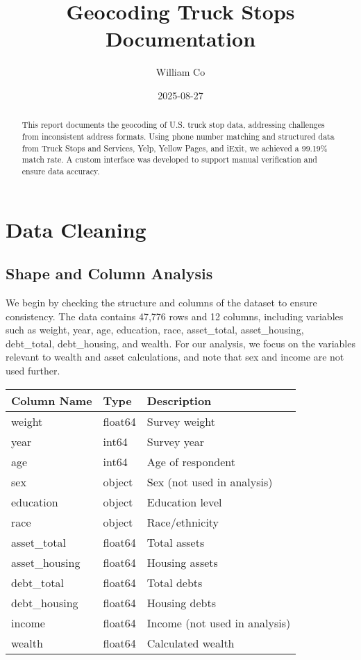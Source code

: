 \documentclass[
  letterpaper,
  DIV=11,
  numbers=noendperiod]{scrartcl}
\title{Geocoding Truck Stops Documentation}
\author{William Co}
\date{2025-08-27}
\renewcommand*\contentsname{Table of contents}
\newcommand\contentsname{Table of contents}
\begin{document}
\maketitle
\begin{abstract}
This report documents the geocoding of U.S. truck stop data, addressing
challenges from inconsistent address formats. Using phone number
matching and structured data from Truck Stops and Services, Yelp, Yellow
Pages, and iExit, we achieved a 99.19\% match rate. A custom interface
was developed to support manual verification and ensure data accuracy.
\end{abstract}

\renewcommand*\contentsname{Table of contents}
{
\hypersetup{linkcolor=}
\setcounter{tocdepth}{3}
\tableofcontents
}
\section{Data Cleaning}\label{data-cleaning}

\subsection{Shape and Column Analysis}\label{shape-and-column-analysis}

We begin by checking the structure and columns of the dataset to ensure
consistency. The data contains 47,776 rows and 12 columns, including
variables such as weight, year, age, education, race, asset\_total,
asset\_housing, debt\_total, debt\_housing, and wealth. For our
analysis, we focus on the variables relevant to wealth and asset
calculations, and note that sex and income are not used further.

\begin{longtable}[]{@{}lll@{}}
\toprule\noalign{}
Column Name & Type & Description \\
\midrule\noalign{}
\endhead
\bottomrule\noalign{}
\endlastfoot
weight & float64 & Survey weight \\
year & int64 & Survey year \\
age & int64 & Age of respondent \\
sex & object & Sex (not used in analysis) \\
education & object & Education level \\
race & object & Race/ethnicity \\
asset\_total & float64 & Total assets \\
asset\_housing & float64 & Housing assets \\
debt\_total & float64 & Total debts \\
debt\_housing & float64 & Housing debts \\
income & float64 & Income (not used in analysis) \\
wealth & float64 & Calculated wealth \\
\end{longtable}
\end{document}
